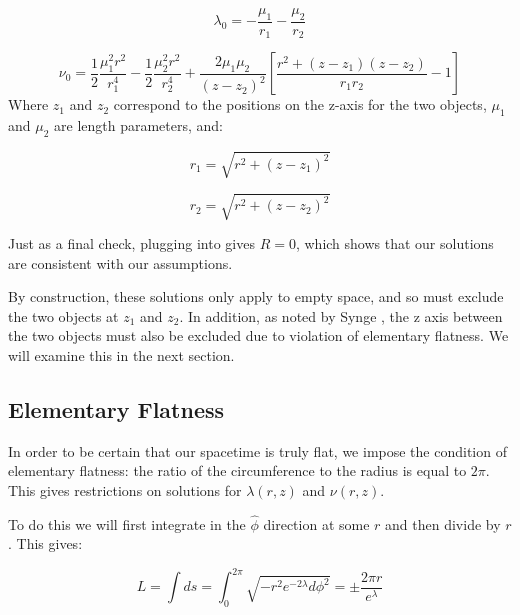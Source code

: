 \documentclass{article}
\begin{document}
\begin{equation}
\lambda_0=-\frac{\mu_1}{r_1}-\frac{\mu_2}{r_2}
\label{eq:lambda-0}
\end{equation}

\begin{equation}
	\label{eq:nu-0}
	\nu_0=\frac{1}{2}\frac{\mu_{1}^{2}r^2}{r_{1}^{4}}-\frac{1}{2}\frac{\mu_{2}^{2}r^2}{r_{2}^{4}}+\frac{2\mu_1\mu_2}{(z-z_2)^2}\left[\frac{r^2+(z-z_1)(z-z_2)}{r_{1}r_{2}}-1\right]
\end{equation}
Where $z_1$ and $z_2$ correspond to the positions on the z-axis for the two objects, $\mu_1$ and $\mu_2$ are length parameters, and:

\begin{equation}
r_1=\sqrt{r^2+(z-z_1)^2}
\label{eq:r_1}
\end{equation}

\begin{equation}
r_2=\sqrt{r^2+(z-z_2)^2}
\label{eq:r_2}
\end{equation}

Just as a final check, plugging  into  gives $R=0$, which shows that our solutions are consistent with our assumptions.

By construction, these solutions only apply to empty space, and so must exclude the two objects at $z_1$ and $z_2$. In addition, as noted by Synge \cite{synge_relativity}, the z axis between the two objects must also be excluded due to violation of elementary flatness. We will examine this in the next section.

\subsection{Elementary Flatness}

In order to be certain that our spacetime is truly flat, we impose the condition of elementary flatness: the ratio of the circumference to the radius is equal to $2\pi$. This gives restrictions on solutions for $\lambda\left(r,z\right)$ and $\nu\left(r,z\right)$.

To do this we will first integrate in the $\hat{\phi}$ direction at
some $r$ and then divide by $r$. This gives:

\begin{equation}
  \label{eq:phi-hat-length}
  L=\int ds =
  \int_0^{2\pi}\sqrt{-r^2e^{-2\lambda}d\phi^2}=\pm\frac{2\pi r}{e^{\lambda}}
\end{equation}
\end{document}
